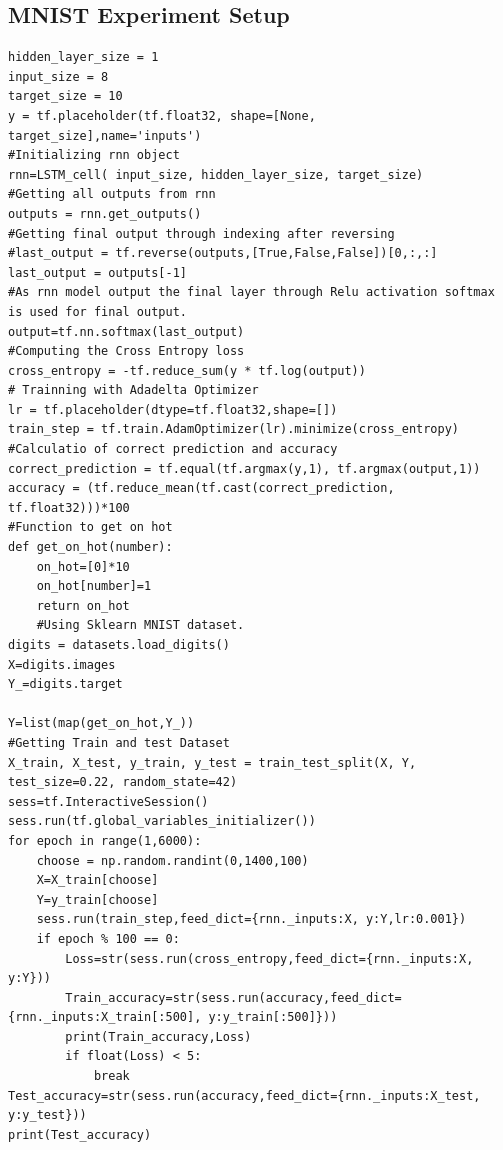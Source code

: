 \documentclass[12pt, letterpaper]{article}
\begin{document}
\subsection{MNIST Experiment Setup}
\begin{verbatim}
hidden_layer_size = 1
input_size = 8
target_size = 10
y = tf.placeholder(tf.float32, shape=[None, target_size],name='inputs')
#Initializing rnn object
rnn=LSTM_cell( input_size, hidden_layer_size, target_size)
#Getting all outputs from rnn
outputs = rnn.get_outputs()
#Getting final output through indexing after reversing
#last_output = tf.reverse(outputs,[True,False,False])[0,:,:]
last_output = outputs[-1]
#As rnn model output the final layer through Relu activation softmax is used for final output.
output=tf.nn.softmax(last_output)
#Computing the Cross Entropy loss 
cross_entropy = -tf.reduce_sum(y * tf.log(output))
# Trainning with Adadelta Optimizer
lr = tf.placeholder(dtype=tf.float32,shape=[])
train_step = tf.train.AdamOptimizer(lr).minimize(cross_entropy)
#Calculatio of correct prediction and accuracy
correct_prediction = tf.equal(tf.argmax(y,1), tf.argmax(output,1))
accuracy = (tf.reduce_mean(tf.cast(correct_prediction, tf.float32)))*100
#Function to get on hot
def get_on_hot(number):
    on_hot=[0]*10
    on_hot[number]=1
    return on_hot
    #Using Sklearn MNIST dataset.
digits = datasets.load_digits()
X=digits.images
Y_=digits.target

Y=list(map(get_on_hot,Y_))
#Getting Train and test Dataset
X_train, X_test, y_train, y_test = train_test_split(X, Y, test_size=0.22, random_state=42)
sess=tf.InteractiveSession()
sess.run(tf.global_variables_initializer())
for epoch in range(1,6000):
    choose = np.random.randint(0,1400,100)
    X=X_train[choose]
    Y=y_train[choose]
    sess.run(train_step,feed_dict={rnn._inputs:X, y:Y,lr:0.001})
    if epoch % 100 == 0:
        Loss=str(sess.run(cross_entropy,feed_dict={rnn._inputs:X, y:Y}))
        Train_accuracy=str(sess.run(accuracy,feed_dict={rnn._inputs:X_train[:500], y:y_train[:500]}))
        print(Train_accuracy,Loss)
        if float(Loss) < 5:
            break
Test_accuracy=str(sess.run(accuracy,feed_dict={rnn._inputs:X_test, y:y_test}))
print(Test_accuracy)

\end{verbatim}
\end{document}
